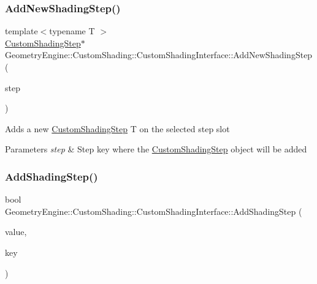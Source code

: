 \subsubsection{\texorpdfstring{AddNewShadingStep()}{AddNewShadingStep()}}
{\footnotesize\ttfamily template$<$typename T $>$ \\
\mbox{\hyperlink{class_geometry_engine_1_1_custom_shading_1_1_custom_shading_step}{Custom\+Shading\+Step}}$\ast$ Geometry\+Engine\+::\+Custom\+Shading\+::\+Custom\+Shading\+Interface\+::\+Add\+New\+Shading\+Step (\begin{DoxyParamCaption}\item[{\mbox{\hyperlink{namespace_geometry_engine_1_1_custom_shading_a2dc236a5b567da5099069ce2b2be5609}{Custom\+Shading\+Steps}}}]{step }\end{DoxyParamCaption})\hspace{0.3cm}{\ttfamily [inline]}}

Adds a new \mbox{\hyperlink{class_geometry_engine_1_1_custom_shading_1_1_custom_shading_step}{Custom\+Shading\+Step}} T on the selected step slot 
\begin{DoxyParams}{Parameters}
{\em step} & Step key where the \mbox{\hyperlink{class_geometry_engine_1_1_custom_shading_1_1_custom_shading_step}{Custom\+Shading\+Step}} object will be added \\
\hline
\end{DoxyParams}
\mbox{\label{class_geometry_engine_1_1_custom_shading_1_1_custom_shading_interface_ae0eae78736701db330dd03ecc18ef044}} 
\subsubsection{\texorpdfstring{AddShadingStep()}{AddShadingStep()}}
{\footnotesize\ttfamily bool Geometry\+Engine\+::\+Custom\+Shading\+::\+Custom\+Shading\+Interface\+::\+Add\+Shading\+Step (\begin{DoxyParamCaption}\item[{\mbox{\hyperlink{class_geometry_engine_1_1_custom_shading_1_1_custom_shading_step}{Custom\+Shading\+Step}} $\ast$}]{value,  }\item[{\mbox{\hyperlink{namespace_geometry_engine_1_1_custom_shading_a2dc236a5b567da5099069ce2b2be5609}{Custom\+Shading\+Steps}}}]{key }\end{DoxyParamCaption})}


